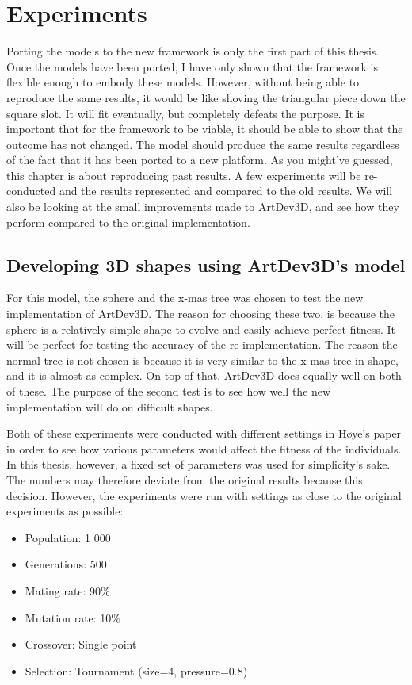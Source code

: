 \section{Experiments}
\label{sec:experiments}
Porting the models to the new framework is only the first part of this thesis. Once the models have been ported, I have only shown that the framework is flexible enough to embody these models. However, without being able to reproduce the same results, it would be like shoving the triangular piece down the square slot. It will fit eventually, but completely defeats the purpose. It is important that for the framework to be viable, it should be able to show that the outcome has not changed. The model should produce the same results regardless of the fact that it has been ported to a new platform. As you might've guessed, this chapter is about reproducing past results. A few experiments will be re-conducted and the results represented and compared to the old results. We will also be looking at the small improvements made to ArtDev3D, and see how they perform compared to the original implementation.


\subsection{Developing 3D shapes using ArtDev3D's model}
For this model, the sphere and the x-mas tree was chosen to test the new implementation of ArtDev3D. The reason for choosing these two, is because the sphere is a relatively simple shape to evolve and easily achieve perfect fitness. It will be perfect for testing the accuracy of the re-implementation. The reason the normal tree is not chosen is because it is very similar to the x-mas tree in shape, and it is almost as complex. On top of that, ArtDev3D does equally well on both of these. The purpose of the second test is to see how well the new implementation will do on difficult shapes.

Both of these experiments were conducted with different settings in H{\o}ye's paper\cite{hoye2006} in order to see how various parameters would affect the fitness of the individuals. In this thesis, however, a fixed set of parameters was used for simplicity's sake. The numbers may therefore deviate from the original results because this decision. However, the experiments were run with settings as close to the original experiments as possible:

\begin{itemize}
	\itemsep=-2pt
	\item Population: 1 000
	\item Generations: 500
	\item Mating rate: 90\%
	\item Mutation rate: 10\%
	\item Crossover: Single point
	\item Selection: Tournament (size=4, pressure=0.8)
\end{itemize}

